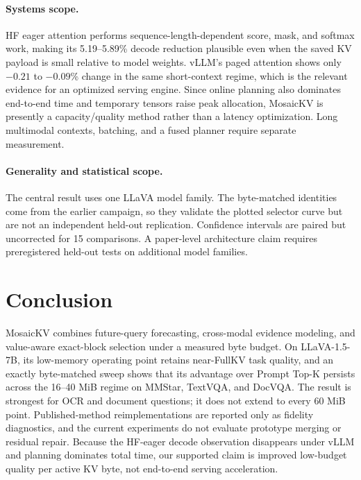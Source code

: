 \paragraph{Systems scope.}
HF eager attention performs sequence-length-dependent score, mask, and
softmax work, making its 5.19--5.89\% decode reduction plausible even when the
saved KV payload is small relative to model weights.  vLLM's paged attention
shows only \(-0.21\) to \(-0.09\)\% change in the same short-context regime,
which is the relevant evidence for an optimized serving engine.  Since online
planning also dominates end-to-end time and temporary tensors raise peak
allocation, MosaicKV is presently a capacity/quality method rather than a
latency optimization.  Long multimodal contexts, batching, and a fused
planner require separate measurement.

\paragraph{Generality and statistical scope.}
The central result uses one LLaVA model family.  The byte-matched identities
come from the earlier campaign, so they validate the plotted selector curve
but are not an independent held-out replication.  Confidence intervals are
paired but uncorrected for 15 comparisons.  A paper-level architecture claim
requires preregistered held-out tests on additional model families.

\section{Conclusion}

MosaicKV combines future-query forecasting, cross-modal evidence modeling,
and value-aware exact-block selection under a measured byte budget.  On
LLaVA-1.5-7B, its low-memory operating point retains near-FullKV task quality,
and an exactly byte-matched sweep shows that its advantage over Prompt Top-K
persists across the 16--40 MiB regime on MMStar, TextVQA, and DocVQA.  The
result is strongest for OCR and document questions; it does not extend to
every 60 MiB point.  Published-method reimplementations are reported only as
fidelity diagnostics, and the current experiments do not evaluate prototype
merging or residual repair.  Because the HF-eager decode observation
disappears under vLLM and planning dominates total time, our supported claim
is improved low-budget quality per active KV byte, not end-to-end serving
acceleration.
